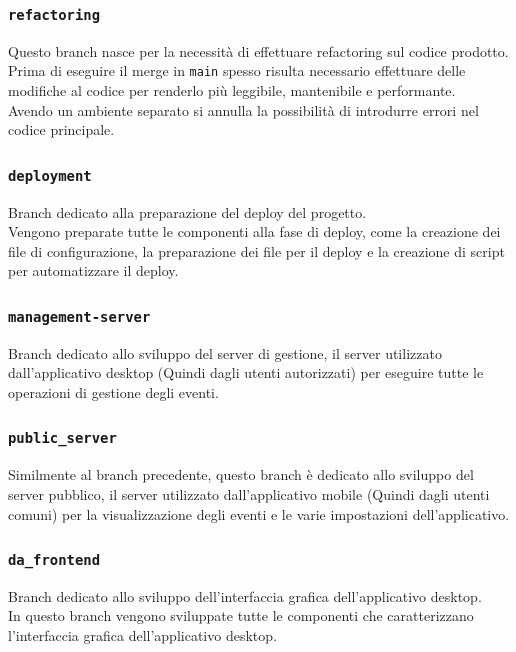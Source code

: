 \documentclass{article}
\begin{document}
\subsubsection{\texttt{refactoring}}

Questo branch nasce per la necessità di effettuare refactoring sul codice prodotto. Prima di eseguire il merge in \texttt{main} spesso risulta necessario effettuare delle modifiche al codice per renderlo più leggibile, mantenibile e performante.\\
Avendo un ambiente separato si annulla la possibilità di introdurre errori nel codice principale.

\subsubsection{\texttt{deployment}}

Branch dedicato alla preparazione del deploy del progetto.\\
Vengono preparate tutte le componenti alla fase di deploy, come la creazione dei file di configurazione, la preparazione dei file per il deploy e la creazione di script per automatizzare il deploy.

\subsubsection{\texttt{management-server}}

Branch dedicato allo sviluppo del server di gestione, il server utilizzato dall'applicativo desktop (Quindi dagli utenti autorizzati) per eseguire tutte le operazioni di gestione degli eventi.

\subsubsection{\texttt{public\_server}}

Similmente al branch precedente, questo branch è dedicato allo sviluppo del server pubblico, il server utilizzato dall'applicativo mobile (Quindi dagli utenti comuni) per la visualizzazione degli eventi e le varie impostazioni dell'applicativo.

\subsubsection{\texttt{da\_frontend}}

Branch dedicato allo sviluppo dell'interfaccia grafica dell'applicativo desktop.\\
In questo branch vengono sviluppate tutte le componenti che caratterizzano l'interfaccia grafica dell'applicativo desktop.
\end{document}
